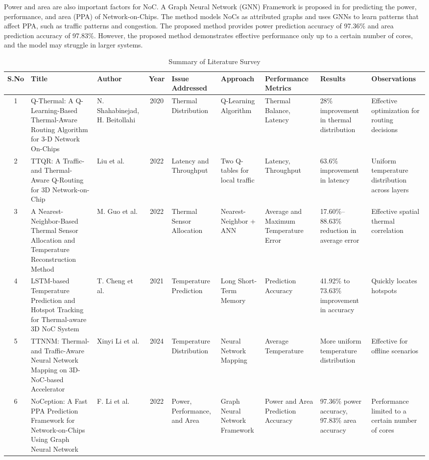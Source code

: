 \documentclass[conference]{IEEEtran}
\begin{document}
Power and area are also important factors for NoC. A Graph Neural Network (GNN) Framework is proposed in \cite{gnn_framework} for predicting the power, performance, and area (PPA) of Network-on-Chips. The method models NoCs as attributed graphs and uses GNNs to learn patterns that affect PPA, such as traffic patterns and congestion. The proposed method provides power prediction accuracy of 97.36\% and area prediction accuracy of 97.83\%. However, the proposed method demonstrates effective performance only up to a certain number of cores, and the model may struggle in larger systems.



\begin{table*}[htbp]
    \centering
    \caption*{Summary of Literature Survey} %
    \begin{tabularx}{\textwidth}{|c|X|X|c|X|X|X|X|X|} %
        \hline
        S.No & Title & Author & Year & Issue Addressed & Approach & Performance Metrics & Results & Observations \\
        \hline
        1 & Q-Thermal: A Q-Learning-Based Thermal-Aware Routing Algorithm for 3-D Network On-Chips & N. Shahabinejad, H. Beitollahi & 2020 & Thermal Distribution & Q-Learning Algorithm & Thermal Balance, Latency & 28\% improvement in thermal distribution & Effective optimization for routing decisions \\
        \hline
        2 & TTQR: A Traffic- and Thermal-Aware Q-Routing for 3D Network-on-Chip & Liu et al. & 2022 & Latency and Throughput & Two Q-tables for local traffic & Latency, Throughput & 63.6\% improvement in latency & Uniform temperature distribution across layers \\
        \hline
        3 & A Nearest-Neighbor-Based Thermal Sensor Allocation and Temperature Reconstruction Method & M. Guo et al. & 2022 & Thermal Sensor Allocation & Nearest-Neighbor + ANN & Average and Maximum Temperature Error & 17.60\%–88.63\% reduction in average error & Effective spatial thermal correlation \\
        \hline
        4 & LSTM-based Temperature Prediction and Hotspot Tracking for Thermal-aware 3D NoC System & T. Cheng et al. & 2021 & Temperature Prediction & Long Short-Term Memory & Prediction Accuracy & 41.92\% to 73.63\% improvement in accuracy & Quickly locates hotspots \\
        \hline
        5 & TTNNM: Thermal- and Traffic-Aware Neural Network Mapping on 3D-NoC-based Accelerator & Xinyi Li et al. & 2024 & Temperature Distribution & Neural Network Mapping & Average Temperature & More uniform temperature distribution & Effective for offline scenarios \\
        \hline
        6 & NoCeption: A Fast PPA Prediction Framework for Network-on-Chips Using Graph Neural Network & F. Li et al. & 2022 & Power, Performance, and Area & Graph Neural Network Framework & Power and Area Prediction Accuracy & 97.36\% power accuracy, 97.83\% area accuracy & Performance limited to a certain number of cores \\


\end{tabularx}
\end{table*}
\end{document}

